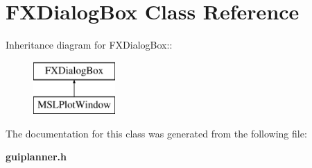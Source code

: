 \section{FXDialog\-Box  Class Reference}
\label{classFXDialogBox}
Inheritance diagram for FXDialog\-Box::\begin{figure}[H]
\begin{center}
\leavevmode
\includegraphics[height=2cm]{classFXDialogBox}
\end{center}
\end{figure}


The documentation for this class was generated from the following file:\begin{CompactItemize}
\item 
{\bf guiplanner.h}\end{CompactItemize}
